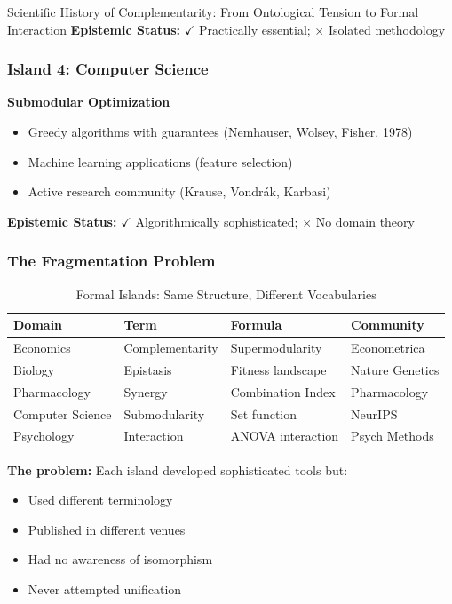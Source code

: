 \begin{chapter}{Scientific History of Complementarity: From Ontological Tension to Formal Interaction}
\textbf{Epistemic Status:} $\checkmark$ Practically essential; $\times$ Isolated methodology

\subsubsection{Island 4: Computer Science}

\textbf{Submodular Optimization}
\begin{itemize}[noitemsep]
    \item Greedy algorithms with guarantees (Nemhauser, Wolsey, Fisher, 1978)
    \item Machine learning applications (feature selection)
    \item Active research community (Krause, Vondrák, Karbasi)
\end{itemize}

\textbf{Epistemic Status:} $\checkmark$ Algorithmically sophisticated; $\times$ No domain theory

\subsubsection{The Fragmentation Problem}

\begin{table}[h]
\centering
\caption{Formal Islands: Same Structure, Different Vocabularies}
\label{tab:formal-islands}
\renewcommand{\arraystretch}{1.3}
\begin{tabular}{@{}llll@{}}
\toprule
\textbf{Domain} & \textbf{Term} & \textbf{Formula} & \textbf{Community} \\
\midrule
Economics & Complementarity & Supermodularity & Econometrica \\
Biology & Epistasis & Fitness landscape & Nature Genetics \\
Pharmacology & Synergy & Combination Index & Pharmacology \\
Computer Science & Submodularity & Set function & NeurIPS \\
Psychology & Interaction & ANOVA interaction & Psych Methods \\
\bottomrule
\end{tabular}
\end{table}

\textbf{The problem:} Each island developed sophisticated tools but:
\begin{itemize}[noitemsep]
    \item Used different terminology
    \item Published in different venues
    \item Had no awareness of isomorphism
    \item Never attempted unification
\end{itemize}


\end{chapter}
